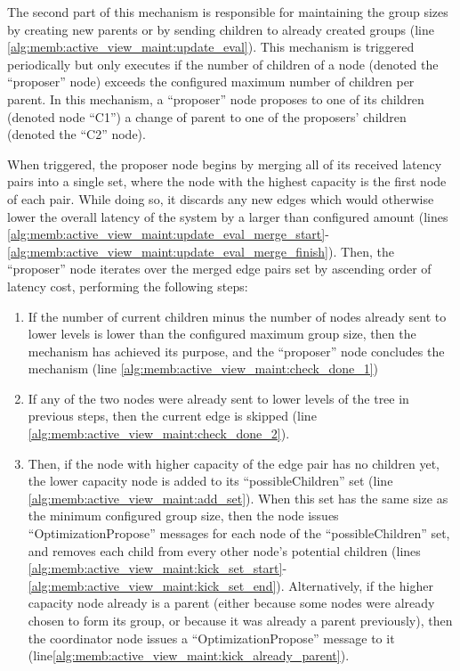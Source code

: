 The second part of this mechanism is responsible for maintaining the group sizes by creating new parents or by sending children to already created groups (line \ref{alg:memb:active_view_maint:update_eval}). This mechanism is triggered periodically but only executes if the number of children of a  node (denoted the ``proposer'' node) exceeds the configured maximum number of children per parent. In this mechanism, a ``proposer'' node proposes to one of its children (denoted node ``C1'') a change of parent to one of the proposers' children (denoted the ``C2'' node).


When triggered, the proposer node begins by merging all of its received latency pairs into a single set, where the node with the highest capacity is the first node of each pair. While doing so, it discards any new edges which would otherwise lower the overall latency of the system by a larger than configured amount (lines \ref{alg:memb:active_view_maint:update_eval_merge_start}-\ref{alg:memb:active_view_maint:update_eval_merge_finish}). Then, the ``proposer'' node iterates over the merged edge pairs set by ascending order of latency cost, performing the following steps:

\begin{enumerate}
    \item If the number of current children minus the number of nodes already sent to lower levels is lower than the configured maximum group size, then the mechanism has achieved its purpose, and the ``proposer'' node concludes the mechanism (line \ref{alg:memb:active_view_maint:check_done_1})
    
    \item If any of the two nodes were already sent to lower levels of the tree in previous steps, then the current edge is skipped (line \ref{alg:memb:active_view_maint:check_done_2}).
    
    \item Then, if the node with higher capacity of the edge pair has no children yet, the lower capacity node is added to its ``possibleChildren'' set (line \ref{alg:memb:active_view_maint:add_set}). When this set has the same size as the minimum configured group size, then the node issues ``OptimizationPropose'' messages for each node of the ``possibleChildren'' set, and removes each child from every other node's potential children (lines \ref{alg:memb:active_view_maint:kick_set_start}-\ref{alg:memb:active_view_maint:kick_set_end}). Alternatively, if the higher capacity node already is a parent (either because some nodes were already chosen to form its group, or because it was already a parent previously), then the coordinator node issues a ``OptimizationPropose'' message to it (line\ref{alg:memb:active_view_maint:kick_already_parent}).
\end{enumerate}


